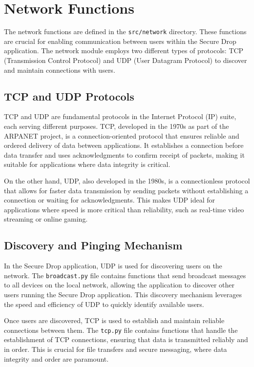 \documentclass[12pt]{article}
\begin{document}
\newpage

\section{Network Functions}
The network functions are defined in the \texttt{src/network} directory. These functions are crucial for enabling communication between users within the Secure Drop application. The network module employs two different types of protocols: TCP (Transmission Control Protocol) and UDP (User Datagram Protocol) to discover and maintain connections with users.

\subsection{TCP and UDP Protocols}
TCP and UDP are fundamental protocols in the Internet Protocol (IP) suite, each serving different purposes. TCP, developed in the 1970s as part of the ARPANET project, is a connection-oriented protocol that ensures reliable and ordered delivery of data between applications. It establishes a connection before data transfer and uses acknowledgments to confirm receipt of packets, making it suitable for applications where data integrity is critical.

On the other hand, UDP, also developed in the 1980s, is a connectionless protocol that allows for faster data transmission by sending packets without establishing a connection or waiting for acknowledgments. This makes UDP ideal for applications where speed is more critical than reliability, such as real-time video streaming or online gaming.

\subsection{Discovery and Pinging Mechanism}
In the Secure Drop application, UDP is used for discovering users on the network. The \texttt{broadcast.py} file contains functions that send broadcast messages to all devices on the local network, allowing the application to discover other users running the Secure Drop application. This discovery mechanism leverages the speed and efficiency of UDP to quickly identify available users.

Once users are discovered, TCP is used to establish and maintain reliable connections between them. The \texttt{tcp.py} file contains functions that handle the establishment of TCP connections, ensuring that data is transmitted reliably and in order. This is crucial for file transfers and secure messaging, where data integrity and order are paramount.
\end{document}
